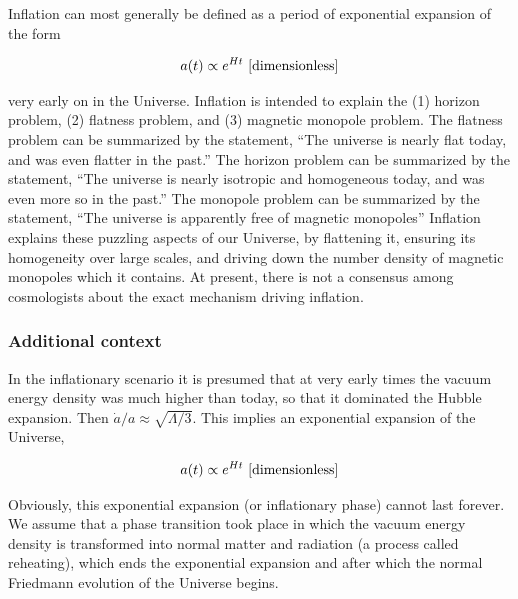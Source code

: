\documentclass[a4paper,11pt]{article}
\begin{document}
Inflation can most generally be defined as a period of exponential expansion of the form

\begin{align*}
    a(t) \propto e^{Ht} ~ [{\rm dimensionless}]
\end{align*}

{\noindent}very early on in the Universe. Inflation is intended to explain the (1) horizon problem, (2) flatness problem, and (3) magnetic monopole problem. The flatness problem can be summarized by the statement, ``The universe is nearly flat today, and was even flatter in the past.'' The horizon problem can be summarized by the statement, ``The universe is nearly isotropic and homogeneous today, and was even more so in the past.'' The monopole problem can be summarized by the statement, ``The universe is apparently free of magnetic monopoles'' Inflation explains these puzzling aspects of our Universe, by flattening it, ensuring its homogeneity over large scales, and driving down the number density of magnetic monopoles which it contains. At present, there is not a consensus among cosmologists about the exact mechanism driving inflation.

\subsubsection{Additional context}

In the inflationary scenario it is presumed that at very
early times the vacuum energy density was much higher
than today, so that it dominated the Hubble expansion. Then $\dot{a}/a\approx\sqrt{\Lambda/3}$. This implies an exponential expansion of the Universe,

\begin{align*}
    a(t) \propto e^{Ht} ~ [{\rm dimensionless}]
\end{align*}

{\noindent}Obviously, this exponential expansion (or inflationary phase) cannot last forever. We assume that a phase transition took place in which the vacuum energy density is transformed into normal matter and radiation (a process called reheating), which ends the exponential expansion and after which the normal Friedmann evolution of the Universe begins.
\end{document}
